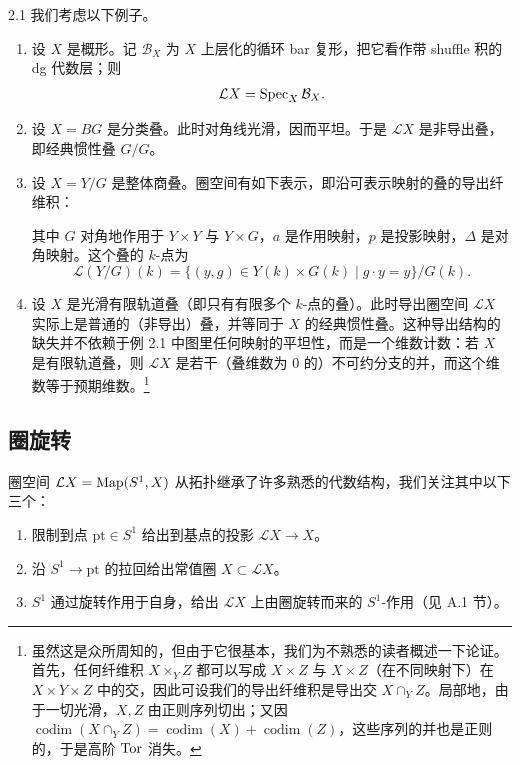\begin{exam}{2.1}\label{exam:a5-01-1}
我们考虑以下例子。
\begin{enumerate}[(1),itemsep=2pt]
\item 设 $X$ 是概形。记 $\mathcal B_X$ 为 $X$ 上层化的循环 bar 复形，把它看作带 shuffle 积的 dg 代数层；则
\[
\mathcal L X=\operatorname{Spec}_X\mathcal B_X.
\]
\item 设 $X=BG$ 是分类叠。此时对角线光滑，因而平坦。于是 $\mathcal L X$ 是非导出叠，即经典惯性叠 $G/G$。
\item 设 $X=Y/G$ 是整体商叠。圈空间有如下表示，即沿可表示映射的叠的导出纤维积：
\begin{center}
\end{center}
其中 $G$ 对角地作用于 $Y\times Y$ 与 $Y\times G$，$a$ 是作用映射，$p$ 是投影映射，$\Delta$ 是对角映射。这个叠的 $k$-点为
\[
\mathcal L(Y/G)(k)=\{(y,g)\in Y(k)\times G(k)\mid g\cdot y=y\}/G(k).
\]
\item 设 $X$ 是光滑有限轨道叠（即只有有限多个 $k$-点的叠）。此时导出圈空间 $\mathcal L X$ 实际上是普通的（非导出）叠，并等同于 $X$ 的经典惯性叠。这种导出结构的缺失并不依赖于例 2.1 中图里任何映射的平坦性，而是一个维数计数：若 $X$ 是有限轨道叠，则 $\mathcal L X$ 是若干（叠维数为 $0$ 的）不可约分支的并，而这个维数等于预期维数。\footnote{虽然这是众所周知的，但由于它很基本，我们为不熟悉的读者概述一下论证。首先，任何纤维积 $X\times_YZ$ 都可以写成 $X\times Z$ 与 $X\times Z$（在不同映射下）在 $X\times Y\times Z$ 中的交，因此可设我们的导出纤维积是导出交 $X\cap_YZ$。局部地，由于一切光滑，$X,Z$ 由正则序列切出；又因 $\operatorname{codim}(X\cap_YZ)=\operatorname{codim}(X)+\operatorname{codim}(Z)$，这些序列的并也是正则的，于是高阶 $\operatorname{Tor}$ 消失。}
\end{enumerate}
\end{exam}

\subsection{圈旋转}

圈空间 $\mathcal L X=\operatorname{Map}(S^1,X)$ 从拓扑继承了许多熟悉的代数结构，我们关注其中以下三个：
\begin{enumerate}[(1),itemsep=2pt]
\item 限制到点 $\mathrm{pt}\in S^1$ 给出到基点的投影 $\mathcal L X\to X$。
\item 沿 $S^1\to\mathrm{pt}$ 的拉回给出常值圈 $X\subset\mathcal L X$。
\item $S^1$ 通过旋转作用于自身，给出 $\mathcal L X$ 上由圈旋转而来的 $S^1$-作用（见 A.1 节）。
\end{enumerate}

